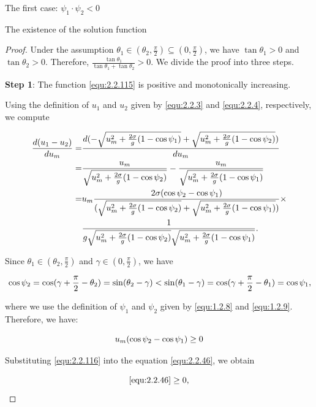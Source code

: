 \documentclass[letterpaper,reqno,10pt,twoside]{amsart}
\theoremstyle{definition}
\theoremstyle{remark}
\begin{document}
\begin{section}{The first case: $\psi_1\cdot \psi_2<0$ }
\begin{subsection}{The existence of the solution function}
\begin{proof}
  Under the assumption $\theta_1\in (\theta_2,\frac{\pi}{2})\subseteq(0,\frac{\pi}{2})$, we have $\tan\theta_1>0$ and $\tan\theta_2>0$. Therefore, $\frac{\tan\theta_1}{\tan\theta_1+\tan\theta_2}>0$. We divide the proof into three steps.

  \textbf{Step 1}: The function \eqref{equ:2.2.115} is positive and monotonically increasing. 
  
 Using the definition of $u_{1}$ and $u_{2}$ given by \eqref{equ:2.2.3} and \eqref{equ:2.2.4}, respectively, we compute

  \begin{align}
      \frac{d(u_1-u_2)}{du_{m}}=&\frac{d(-\sqrt{u_{m}^{2}+\frac{2\sigma}{g}(1-\cos\psi_1)}+\sqrt{u_{m}^{2}+\frac{2\sigma}{g}(1-\cos\psi_2)})}{du_{m}} \notag\\
      =&\frac{u_{m}}{\sqrt{u_{m}^{2}+\frac{2\sigma}{g}(1-\cos\psi_{2})}}-\frac{u_{m}}{\sqrt{u_{m}^{2}+\frac{2\sigma}{g}(1-\cos\psi_1)}}\notag \\
       =&u_{m}\frac{2\sigma(\cos\psi_2-\cos\psi_1)}{(\sqrt{u_{m}^{2}+\frac{2\sigma}{g}(1-\cos\psi_{2})}+\sqrt{u_{m}^{2}+\frac{2\sigma}{g}(1-\cos\psi_{1})})}\times \notag\\
       &\frac{1}{g\sqrt{u_{m}^{2}+\frac{2\sigma}{g}(1-\cos\psi_{2})}\sqrt{u_{m}^{2}+\frac{2\sigma}{g}(1-\cos\psi_1)}} \label{equ:2.2.46}.
  \end{align}
  
   Since $\theta_1\in(\theta_2,\frac{\pi}{2})$ and $\gamma\in (0,\frac{\pi}{2})$, we have

  \begin{equation}{\label{equ:2.2.47}}
  \cos\psi_2=\cos(\gamma+\frac{\pi}{2}-\theta_2)=\sin (\theta_2-\gamma)<\sin(\theta_1-\gamma)=\cos(\gamma+\frac{\pi}{2}-\theta_1)=\cos\psi_1,
  \end{equation}
  
  \noindent where we use the definition of $\psi_1$ and $\psi_2$ given by \eqref{equ:1.2.8} and \eqref{equ:1.2.9}. Therefore, we have:

  \begin{equation}{\label{equ:2.2.116}}
      u_m(\cos\psi_2-\cos\psi_1)\geq 0
  \end{equation}

  \noindent  Substituting \eqref{equ:2.2.116} into the equation \eqref{equ:2.2.46}, we obtain

  \begin{equation*}
      \eqref{equ:2.2.46}\geq 0,
  \end{equation*}


\end{proof}
\end{subsection}
\end{section}
\end{document}
